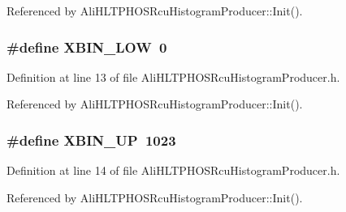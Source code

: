 Referenced by Ali\-HLTPHOSRcu\-Histogram\-Producer::Init().
\subsubsection{\setlength{\rightskip}{0pt plus 5cm}\#define XBIN\_\-LOW\ 0}\label{AliHLTPHOSRcuHistogramProducer_8h_a0}




Definition at line 13 of file Ali\-HLTPHOSRcu\-Histogram\-Producer.h.

Referenced by Ali\-HLTPHOSRcu\-Histogram\-Producer::Init().
\subsubsection{\setlength{\rightskip}{0pt plus 5cm}\#define XBIN\_\-UP\ 1023}\label{AliHLTPHOSRcuHistogramProducer_8h_a1}




Definition at line 14 of file Ali\-HLTPHOSRcu\-Histogram\-Producer.h.

Referenced by Ali\-HLTPHOSRcu\-Histogram\-Producer::Init().